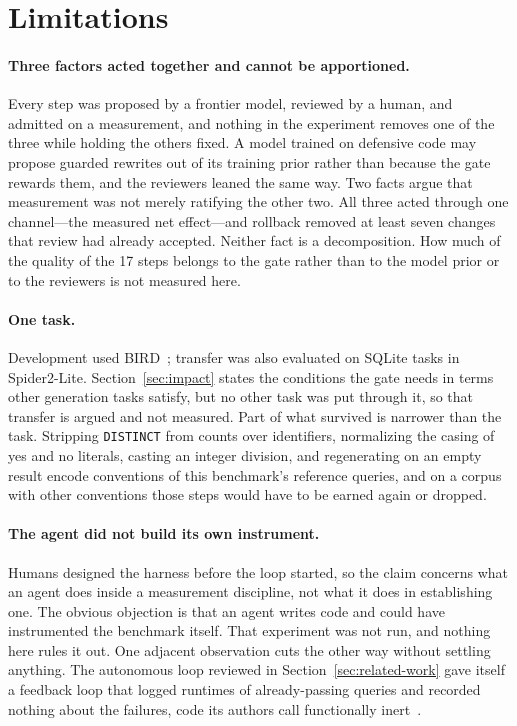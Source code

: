 \section{Limitations}
\label{sec:limitations}

\paragraph{Three factors acted together and cannot be apportioned.} Every step
was proposed by a frontier model, reviewed by a human, and admitted on a
measurement, and nothing in the experiment removes one of the three while
holding the others fixed. A model trained on defensive code may propose guarded
rewrites out of its training prior rather than because the gate rewards them,
and the
reviewers leaned the same way. Two facts argue that measurement was not merely
ratifying the other two. All three acted through one channel---the measured
net effect---and rollback removed at least seven changes that review had
already accepted. Neither fact is a decomposition. How much of the quality of the 17
steps belongs to the gate rather than to the model prior or to the reviewers is
not measured here.

\paragraph{One task.} Development used BIRD~\cite{bird}; transfer was also
evaluated on SQLite tasks in Spider2-Lite. Section~\ref{sec:impact} states the
conditions the gate needs in terms other generation tasks satisfy, but no other
task was put through it, so that transfer is argued and not measured. Part of
what survived is narrower than the task. Stripping \texttt{DISTINCT} from
counts over identifiers, normalizing the casing of yes and no literals, casting
an integer division, and regenerating on an empty result encode conventions of this
benchmark's reference queries, and on a corpus with other conventions those
steps would have to be earned again or dropped.

\paragraph{The agent did not build its own instrument.} Humans designed the
harness before the loop started, so the claim concerns what an agent does
inside a measurement discipline, not what it does in establishing one. The
obvious objection is that an agent writes code and could have instrumented the
benchmark itself. That experiment was not run, and nothing here rules it out.
One adjacent observation cuts the other way without settling anything. The
autonomous loop reviewed in Section~\ref{sec:related-work} gave itself a
feedback loop that logged runtimes of already-passing queries and recorded
nothing about the failures, code its authors call functionally
inert~\cite{ai-scientist-enterprise}.

